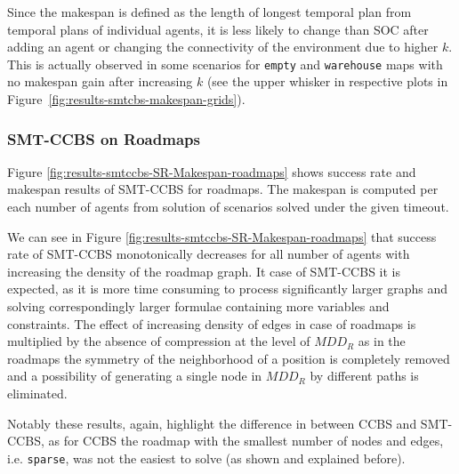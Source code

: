 \documentclass[review]{elsarticle}
\newcommand{\mddr}{\ensuremath{MDD_R}\xspace}
\newcommand{\ccbs}{\ac{CCBS}\xspace}
\newcommand{\smtccbs}{SMT-CCBS\xspace}
\begin{document}
Since the makespan is defined as the length of longest temporal plan from temporal plans of individual agents, it is less likely to change than SOC after adding an agent or changing the connectivity of the environment due to higher $k$. This is actually observed in some scenarios for \texttt{empty} and \texttt{warehouse} maps with no makespan gain after increasing $k$ (see the upper whisker in respective plots in Figure~\ref{fig:results-smtcbs-makespan-grids}).

\subsubsection{\smtccbs on Roadmaps}
Figure \ref{fig:results-smtccbs-SR-Makespan-roadmaps} shows success rate and makespan  results of \smtccbs for roadmaps. The makespan is computed per each number of agents from solution of scenarios solved under the given timeout.

We can see in Figure \ref{fig:results-smtccbs-SR-Makespan-roadmaps} that success rate of \smtccbs monotonically decreases for all number of agents with increasing the density of the roadmap graph. It case of \smtccbs it is expected, as it is more time consuming to process significantly larger graphs and solving correspondingly larger formulae containing more variables and constraints. The effect of increasing density of edges in case of roadmaps is multiplied by the absence of compression at the level of \mddr as in the roadmaps the symmetry of the neighborhood of a position is completely removed and  a possibility of generating a single node in \mddr by different paths is eliminated.

Notably these results, again, highlight the difference in between \ccbs and \smtccbs, as for \ccbs the roadmap with the smallest number of nodes and edges, i.e. \texttt{sparse}, was not the easiest to solve (as shown and explained before).
\end{document}
